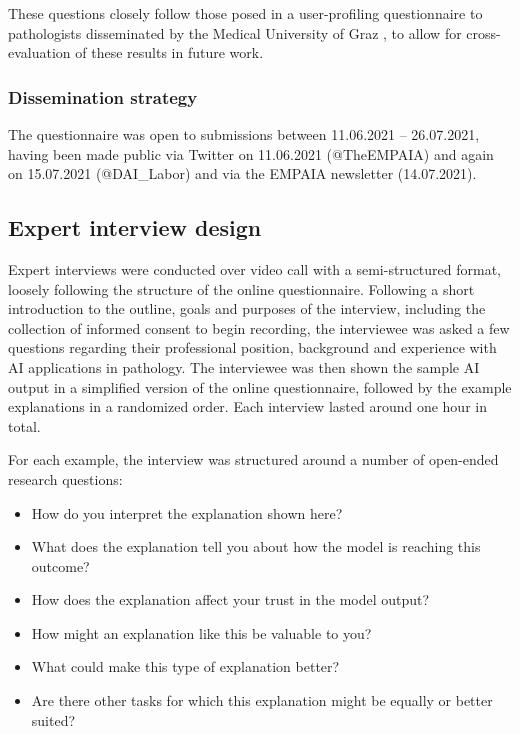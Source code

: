 These questions closely follow those posed in a user-profiling questionnaire to pathologists disseminated by the Medical University of Graz \cite{HolzingerEtAl:2021:PersonasToolbox}, to allow for cross-evaluation of these results in future work.

\subsubsection{Dissemination strategy}

The questionnaire was open to submissions between 11.06.2021 -- 26.07.2021, having been made public via Twitter on 11.06.2021 (@TheEMPAIA) and again on 15.07.2021 (@DAI\_Labor) and via the EMPAIA newsletter (14.07.2021).

\subsection{Expert interview design}
\label{sec:interviewdesign}
Expert interviews were conducted over video call with a semi-structured format, loosely following the structure of the online questionnaire. Following a short introduction to the outline, goals and purposes of the interview, including the collection of informed consent to begin recording, the interviewee was asked a few questions regarding their professional position, background and experience with AI applications in pathology. The interviewee was then shown the sample AI output in a simplified version of the online questionnaire, followed by the example explanations in a randomized order. Each interview lasted around one hour in total.

For each example, the interview was structured around a number of open-ended research questions: 

\begin{itemize}
    \item How do you interpret the explanation shown here?
    \item What does the explanation tell you about how the model is reaching this outcome?
    \item How does the explanation affect your trust in the model output?
    \item How might an explanation like this be valuable to you?
    \item What could make this type of explanation better?
    \item Are there other tasks for which this explanation might be equally or better suited?
\end{itemize}


